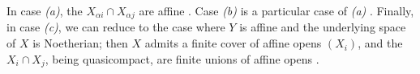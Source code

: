 In case \emph{(a)}, the $X_{\alpha i}\cap X_{\alpha j}$ are affine .
Case \emph{(b)} is a particular case of \emph{(a)} .  Finally, in case
\emph{(c)}, we can reduce to the case where $Y$ is affine and the underlying
space of $X$ is Noetherian; then $X$ admits a finite cover of affine opens
$(X_i)$, and the $X_i\cap X_j$, being quasicompact, are finite unions of affine
opens .

